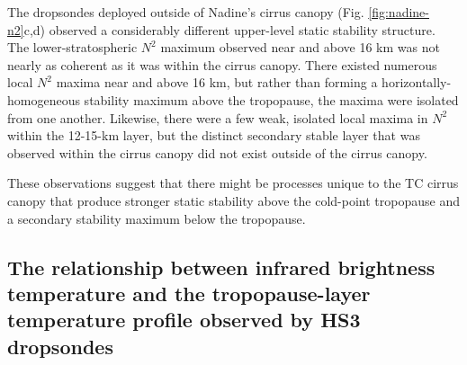 The dropsondes deployed outside of Nadine's cirrus canopy (Fig. \ref{fig:nadine-n2}c,d) observed a considerably different upper-level static stability structure.
The lower-stratospheric $N^2$ maximum observed near and above 16 km was not nearly as coherent as it was within the cirrus canopy.
There existed numerous local $N^2$ maxima near and above 16 km, but rather than forming a horizontally-homogeneous stability maximum above the tropopause, the maxima were isolated from one another.
Likewise, there were a few weak, isolated local maxima in $N^2$ within the 12-15-km layer, but the distinct secondary stable layer that was observed within the cirrus canopy did not exist outside of the cirrus canopy.

These observations suggest that there might be processes unique to the TC cirrus canopy that produce stronger static stability above the cold-point tropopause and a secondary stability maximum below the tropopause.

\subsection{The relationship between infrared brightness temperature and the tropopause-layer temperature profile observed by HS3 dropsondes}
\label{hs3-irbt}

